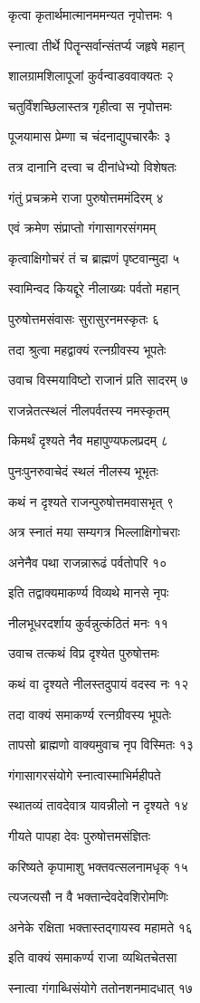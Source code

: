 कृत्वा कृतार्थमात्मानममन्यत नृपोत्तमः १

स्नात्वा तीर्थे पितॄन्सर्वान्संतर्प्य जहृषे महान्

शालग्रामशिलापूजां कुर्वन्वाडववाक्यतः २

चतुर्विंशच्छिलास्तत्र गृहीत्वा स नृपोत्तमः

पूजयामास प्रेम्णा च चंदनाद्युपचारकैः ३

तत्र दानानि दत्त्वा च दीनांधेभ्यो विशेषतः

गंतुं प्रचक्रमे राजा पुरुषोत्तममंदिरम् ४

एवं क्रमेण संप्राप्तो गंगासागरसंगमम्

कृत्वाक्षिगोचरं तं च ब्राह्मणं पृष्टवान्मुदा ५

स्वामिन्वद कियद्दूरे नीलाख्यः पर्वतो महान्

पुरुषोत्तमसंवासः सुरासुरनमस्कृतः ६

तदा श्रुत्वा महद्वाक्यं रत्नग्रीवस्य भूपतेः

उवाच विस्मयाविष्टो राजानं प्रति सादरम् ७

राजन्नेतत्स्थलं नीलपर्वतस्य नमस्कृतम्

किमर्थं दृश्यते नैव महापुण्यफलप्रदम् ८

पुनःपुनरुवाचेदं स्थलं नीलस्य भूभृतः

कथं न दृश्यते राजन्पुरुषोत्तमवासभृत् ९

अत्र स्नातं मया सम्यगत्र भिल्लाक्षिगोचराः

अनेनैव पथा राजन्नारूढं पर्वतोपरि १०

इति तद्वाक्यमाकर्ण्य विव्यथे मानसे नृपः

नीलभूधरदर्शाय कुर्वन्नुत्कंठितं मनः ११

उवाच तत्कथं विप्र दृश्येत पुरुषोत्तमः

कथं वा दृश्यते नीलस्तदुपायं वदस्व नः १२

तदा वाक्यं समाकर्ण्य रत्नग्रीवस्य भूपतेः

तापसो ब्राह्मणो वाक्यमुवाच नृप विस्मितः १३

गंगासागरसंयोगे स्नात्वास्माभिर्महीपते

स्थातव्यं तावदेवात्र यावन्नीलो न दृश्यते १४

गीयते पापहा देवः पुरुषोत्तमसंज्ञितः

करिष्यते कृपामाशु भक्तवत्सलनामधृक् १५

त्यजत्यसौ न वै भक्तान्देवदेवशिरोमणिः

अनेके रक्षिता भक्तास्तद्गायस्व महामते १६

इति वाक्यं समाकर्ण्य राजा व्यथितचेतसा

स्नात्वा गंगाब्धिसंयोगे ततोनशनमादधात् १७

